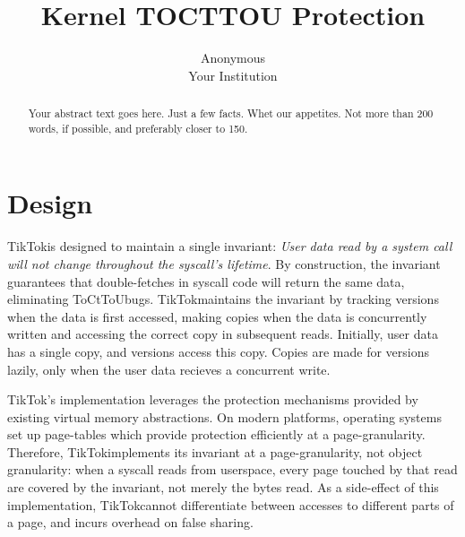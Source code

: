 \documentclass[letterpaper,twocolumn,10pt, anonymous]{article}
\begin{document}


\newcommand\tocttou[0]{ToCtToU}
\newcommand\tiktok[0]{TikTok}

\date{}

\title{\Large \bf Kernel TOCTTOU Protection}

\author{
{\rm Anonymous}\\
Your Institution
} %

\maketitle

\begin{abstract}
Your abstract text goes here. Just a few facts. Whet our appetites.
Not more than 200 words, if possible, and preferably closer to 150.
\end{abstract}

\section{Design}

\tiktok is designed to maintain a single invariant: 
\emph{User data read by a system call will not change throughout the syscall's lifetime}.
By construction, the invariant guarantees that double-fetches in syscall
code will return the same data, eliminating \tocttou bugs. 
\tiktok maintains the invariant by tracking versions when the data is first accessed,
making copies when the data is concurrently written and 
accessing the correct copy in subsequent reads.
Initially, user data has a single copy, and versions access this copy. 
Copies are made for versions lazily, only when the user data recieves a concurrent write.

\tiktok's implementation leverages the protection mechanisms provided by existing 
virtual memory abstractions. 
On modern platforms, operating systems set up page-tables which provide protection
efficiently at a page-granularity. 
Therefore, \tiktok implements its invariant at a page-granularity, not object 
granularity: when a syscall reads from userspace, every page touched by that 
read are covered by the invariant, not merely the bytes read.
As a side-effect of this implementation, \tiktok cannot differentiate between
accesses to different parts of a page, and incurs overhead on false sharing.
\end{document}
